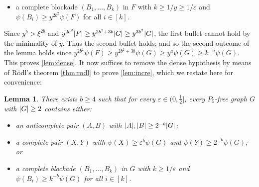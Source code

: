 \documentclass[11pt,reqno]{amsart}
\newtheorem{lemma}[theorem]{Lemma}
\let\oldendproof\endproof
\renewenvironment{proof}[1][\proofname]{%
	\oldproof[\normalfont\bfseries #1]%
}{\oldendproof}
\newcommand{\eps}{\varepsilon}
\DeclarePairedDelimiter\abs{\lvert}{\rvert}%
\begin{document}
\begin{proof}
\begin{itemize}
			\item a complete blockade $(B_1,\ldots,B_k)$ in $F$ with $k\ge1/y\ge1/\eps$ and $\psi(B_i)\ge y^{2b^2}\psi(F)$ for all $i\in[k]$.
		\end{itemize}
		
		Since $y^b>\xi^{2b}$ and $y^{2b^2}\abs F\ge y^{2b^2+3b}\abs G\ge y^{3b^2}\abs G$, the first bullet cannot hold by the minimality of $y$.
		Thus the second bullet holds;
		and so the second outcome of the lemma holds since $y^{2b^2}\psi(F)\ge y^{2b^2+3b}\psi(G)\ge y^a\psi(G)\ge k^{-a}\psi(G)$.
		This proves \cref{lem:dense}.
	\end{proof}
	It now suffices to remove the dense hypothesis by means of R\"odl's theorem \ref{thm:rodl} to prove \cref{lem:incre}, which we restate here for convenience:
	\begin{lemma}
		\label{lem:p5}
		There exists $b\ge4$ such that for every $\eps\in(0,\frac12]$, every $P_5$-free graph $G$ with $\abs G\ge2$ contains either:
		\begin{itemize}
			\item an anticomplete pair $(A,B)$ with $\abs A,\abs B\ge2^{-b}\abs G$;
			
			\item a complete pair $(X,Y)$ with $\psi(X)\ge \eps^b\psi(G)$ and $\psi(Y)\ge2^{-b}\psi(G)$; or
			
			\item a complete blockade $(B_1,\ldots,B_k)$ in $G$ with $k\ge1/\eps$ and $\psi(B_i)\ge k^{-b}\psi(G)$ for all $i\in[k]$.
		\end{itemize}
	\end{lemma}
\end{document}
